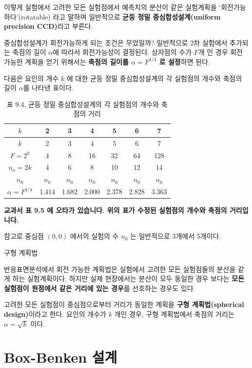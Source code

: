 \documentclass[
]{book}
\makeatletter
\newenvironment{kframe}{%
\medskip{}
\setlength{\fboxsep}{.8em}
 \def\at@end@of@kframe{}%
 \ifinner\ifhmode%
  \def\at@end@of@kframe{\end{minipage}}%
  \begin{minipage}{\columnwidth}%
 \fi\fi%
 \def\FrameCommand##1{\hskip\@totalleftmargin \hskip-\fboxsep
 \colorbox{shadecolor}{##1}\hskip-\fboxsep
     \hskip-\linewidth \hskip-\@totalleftmargin \hskip\columnwidth}%
 \MakeFramed {\advance\hsize-\width
   \@totalleftmargin\z@ \linewidth\hsize
   \@setminipage}}%
 {\par\unskip\endMakeFramed%
 \at@end@of@kframe}
\newenvironment{rmdblock}[1]
  {
  \begin{itemize}
  \renewcommand{\labelitemi}{
    \raisebox{-.7\height}[0pt][0pt]{
      {\setkeys{Gin}{width=3em,keepaspectratio}\texttt{[image: images/\#1]}}
    }
  }
  \setlength{\fboxsep}{1em}
  \begin{kframe}
  \item
  }
  {
  \end{kframe}
  \end{itemize}
  }
\newenvironment{rmdnote}
  {\begin{rmdblock}{note}}
  {\end{rmdblock}}
\theoremstyle{definition}
\theoremstyle{definition}
\theoremstyle{definition}
\theoremstyle{definition}
\theoremstyle{remark}
\makeatother
\begin{document}
이렇게 실험에서 고려한 모든 실험점에서 예측치의 분산이 같은
실험계획을 `회전가능하다'(rotatable) 라고 말하며 일반적으로 \textbf{균등 정밀 중심합성설계(uniform precision CCD)}라고 부른다.

중심합성설계가 회전가능하게 되는 조건은 무었일까? 일반적으로 2차 실험에서 추가되는
축점의 길이 \(\alpha\)에 따라서 회전가능성이 결정된다. 상자점의 수가 \(F\)개 인 경우 회전 가능한 계획을 얻기 위해서는 \textbf{축점의 길이를 \(\alpha= F^{1/4}\) 로 설정}하면 된다.

다음은 요인의 개수 \(k\) 에 대한 균등 정밀 중심합성설계의 각 실험점의 개수와 축점의 길이 \(\alpha\)를
나타낸 표이다.

\begin{longtable}[]{@{}ccccccc@{}}
\caption{표 9.4. 균등 정밀 중심합성설계의 각 실험점의 개수와 축점의 거리}\tabularnewline
\toprule
\(k\) & 2 & 3 & 4 & 5 & 6 & 7\tabularnewline
\midrule
\endfirsthead
\toprule
\(k\) & 2 & 3 & 4 & 5 & 6 & 7\tabularnewline
\midrule
\endhead
\(F=2^k\) & 4 & 8 & 16 & 32 & 64 & 128\tabularnewline
\(n_a=2k\) & 4 & 6 & 8 & 10 & 12 & 14\tabularnewline
\(n_0\) & \(n_0\) & \(n_0\) & \(n_0\) & \(n_0\) & \(n_0\) & \(n_0\)\tabularnewline
\(\alpha = F^{1/4}\) & 1.414 & 1.682 & 2.000 & 2.378 & 2.828 & 3.363\tabularnewline
\bottomrule
\end{longtable}

\textbf{교과서 표 9.5 에 오타가 있습니다. 위의 표가 수정된 실험점의 개수와 축점의 거리입니다.}

참고로 중심점 \((0,0)\) 에서의 실험의 수 \(n_0\) 는 일반적으로 3개에서 5개이다.

\begin{rmdnote}
구형 계획법

반응표면분석에서 회전 가능한 계획법은 실험에서 고려한 모든 실험점들의 분산을 같게 하는
실험계획이다. 하지만 실제 현장에서는 분산이 모두 동일한 경우 보다는 \textbf{모든 실험점이 원점에서 같은 거리에 있는 경우}를 선호하는 경우도 있다.

고려한 모든 실험점이 중심점으로부터 거리가 동일한 계획을 \textbf{구형 계획법(spherical design)}이라고 한다. 요인의 개수가 \(k\) 개인 경우, 구형 계획법에서 축점의 거리는 \(\alpha=\sqrt{k}\) 이다.\\
\end{rmdnote}

\hypertarget{box-benken-uxc124uxacc4}{%
\section{Box-Benken 설계}\label{box-benken-uxc124uxacc4}}
\end{document}

